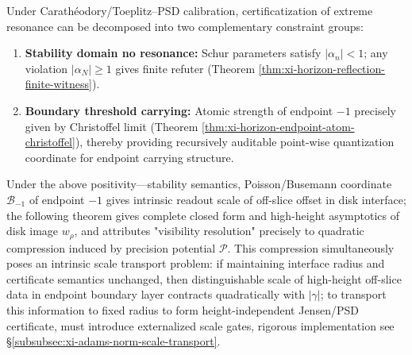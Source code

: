 \begin{corollary}\label{cor:xi-horizon-extreme-resonance-two-stage}
Under Carathéodory/Toeplitz--PSD calibration, certificatization of extreme resonance can be decomposed into two complementary constraint groups:
\begin{enumerate}
  \item \textbf{Stability domain no resonance:} Schur parameters satisfy \(|\alpha_n|<1\); any violation \(|\alpha_N|\ge 1\) gives finite refuter (Theorem \ref{thm:xi-horizon-reflection-finite-witness}).
  \item \textbf{Boundary threshold carrying:} Atomic strength of endpoint \(-1\) precisely given by Christoffel limit (Theorem \ref{thm:xi-horizon-endpoint-atom-christoffel}), thereby providing recursively auditable point-wise quantization coordinate for endpoint carrying structure.
\end{enumerate}
\end{corollary}

Under the above positivity—stability semantics, Poisson/Busemann coordinate \(\mathcal{B}_{-1}\) of endpoint \(-1\) gives intrinsic readout scale of off-slice offset in disk interface; the following theorem gives complete closed form and high-height asymptotics of disk image \(w_\rho\), and attributes "visibility resolution" precisely to quadratic compression induced by precision potential \(\mathcal{P}\).
This compression simultaneously poses an intrinsic scale transport problem: if maintaining interface radius and certificate semantics unchanged, then distinguishable scale of high-height off-slice data in endpoint boundary layer contracts quadratically with \(|\gamma|\); to transport this information to fixed radius to form height-independent Jensen/PSD certificate, must introduce externalized scale gates, rigorous implementation see \S\ref{subsubsec:xi-adams-norm-scale-transport}.

